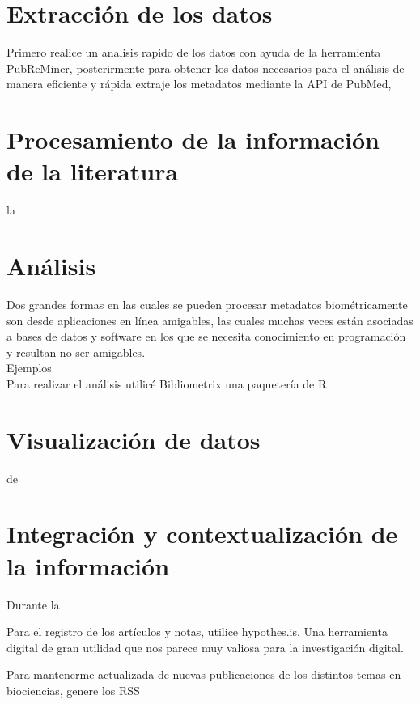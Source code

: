 \section{Extracción de los datos}
\noindent
Primero realice un analisis rapido de los datos con ayuda de la herramienta PubReMiner, 
posterirmente para obtener los datos necesarios para el análisis de manera eficiente y rápida extraje 
los metadatos mediante la API de PubMed,


\section{Procesamiento de la información de la literatura}
\noindent
la
\section{Análisis}
\noindent
Dos grandes formas en las cuales se pueden procesar metadatos biométricamente son desde 
aplicaciones en línea amigables, las cuales muchas veces están asociadas a bases de datos y 
 software en los que se necesita conocimiento en programación y resultan no ser amigables.\\
Ejemplos\\
Para realizar el análisis utilicé Bibliometrix una paquetería de R \parencite{bibliometrix}

\section{Visualización de datos}
\noindent
de
\section{Integración y contextualización de la información}
\noindent
Durante la

\smallskip
Para el registro de los artículos y notas, utilice hypothes.is. Una herramienta digital de gran 
utilidad que nos parece muy valiosa para la investigación digital.

\smallskip
Para mantenerme actualizada de nuevas publicaciones de los distintos temas en biociencias, genere los RSS